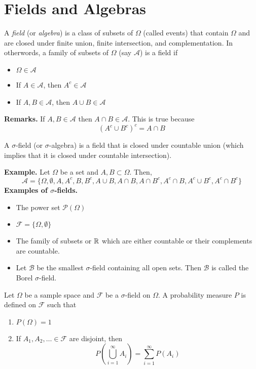 \documentclass[openany]{report}
\begin{document}
\section{Fields and Algebras}
\begin{definition}
    A \emph{field} (or \emph{algebra}) is a class of subsets of $\Omega$ (called events) that contain $\Omega$ and are closed under finite union, finite intersection, and complementation. In otherwords, a family of subsets of $\Omega$ (say $\mathcal{A}$) is a field if 
    \begin{itemize}
        \item $\Omega \in \mathcal{A}$
        \item If $A \in \mathcal{A}$, then $A^c \in \mathcal{A}$
        \item If $A,B \in \mathcal{A}$, then $A \cup B \in \mathcal{A}$
    \end{itemize}
\end{definition}
\noindent
\textbf{Remarks.} If $A,B \in \mathcal{A}$ then $A \cap B \in \mathcal{A}$. This is true because 
\[(A^c \cup B^c)^c = A \cap B\]
\begin{definition}
    A $\sigma$-field (or $\sigma$-algebra) is a field that is closed under countable union (which implies that it is closed under countable intersection).
\end{definition}
\noindent
\textbf{Example.} Let $\Omega$ be a set and $A,B \subset \Omega$. Then, 
\[\mathcal{A} = \{\Omega, \emptyset, A, A^c, B, B^c, A\cup B, A \cap B, A \cap B^c, A^c \cap B, A^c \cup B^c, A^c \cap B^c\}\]
\textbf{Examples of $\sigma$-fields.}
\begin{itemize}
    \item The power set $\mathcal{P}(\Omega)$
    \item $\mathcal{F} = \{\Omega, \emptyset\}$
    \item The family of subsets or $\mathbb{R}$ which are either countable or their complements are countable. 
    \item Let $\mathcal{B}$ be the smallest $\sigma$-field containing all open sets. Then $\mathcal{B}$ is called the Borel $\sigma$-field.
\end{itemize}


\begin{definition}
    Let $\Omega$ be a sample space and $\mathcal{F}$ be a $\sigma$-field on $\Omega$. A probability measure $P$ is defined on $\mathcal{F}$ such that 
    \begin{enumerate}[label=(\roman*)]
        \item $P(\Omega) = 1$
        \item If $A_1, A_2, \ldots \in \mathcal{F}$ are disjoint, then 
        \[P\left(\bigcup_{i=1}^\infty A_i\right) = \sum_{i=1}^\infty P(A_i)\]
    \end{enumerate}
\end{definition}
\end{document}
